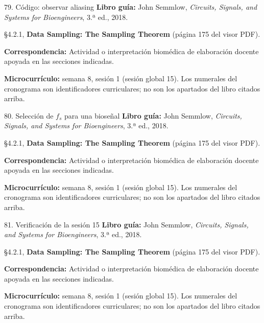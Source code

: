 \documentclass[
  10pt,
  ignorenonframetext,
  aspectratio=169,
  spanish,
]{beamer}
\begin{document}
\begin{frame}{79. Código: observar aliasing}
\label{cuxf3digo-observar-aliasing}
\textbf{Libro guía:} John Semmlow, \emph{Circuits, Signals, and Systems
for Bioengineers}, 3.ª ed., 2018.

§4.2.1, \textbf{Data Sampling: The Sampling Theorem} (página 175 del
visor PDF).

\textbf{Correspondencia:} Actividad o interpretación biomédica de
elaboración docente apoyada en las secciones indicadas.

\textbf{Microcurrículo:} semana 8, sesión 1 (sesión global 15). Los
numerales del cronograma son identificadores curriculares; no son los
apartados del libro citados arriba.
\end{frame}

\begin{frame}{80. Selección de \(f_s\) para una bioseñal}
\label{selecciuxf3n-de-f_s-para-una-bioseuxf1al}
\textbf{Libro guía:} John Semmlow, \emph{Circuits, Signals, and Systems
for Bioengineers}, 3.ª ed., 2018.

§4.2.1, \textbf{Data Sampling: The Sampling Theorem} (página 175 del
visor PDF).

\textbf{Correspondencia:} Actividad o interpretación biomédica de
elaboración docente apoyada en las secciones indicadas.

\textbf{Microcurrículo:} semana 8, sesión 1 (sesión global 15). Los
numerales del cronograma son identificadores curriculares; no son los
apartados del libro citados arriba.
\end{frame}

\begin{frame}{81. Verificación de la sesión 15}
\label{verificaciuxf3n-de-la-sesiuxf3n-15}
\textbf{Libro guía:} John Semmlow, \emph{Circuits, Signals, and Systems
for Bioengineers}, 3.ª ed., 2018.

§4.2.1, \textbf{Data Sampling: The Sampling Theorem} (página 175 del
visor PDF).

\textbf{Correspondencia:} Actividad o interpretación biomédica de
elaboración docente apoyada en las secciones indicadas.

\textbf{Microcurrículo:} semana 8, sesión 1 (sesión global 15). Los
numerales del cronograma son identificadores curriculares; no son los
apartados del libro citados arriba.
\end{frame}
\end{document}

